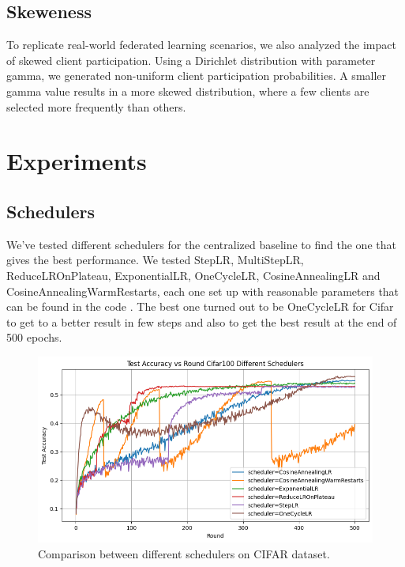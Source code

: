 \documentclass[10pt,twocolumn,letterpaper]{article}
\begin{document}
\subsection{Skeweness}
To replicate real-world federated learning scenarios, we also analyzed the impact of skewed client participation.
Using a Dirichlet distribution with parameter gamma, we generated non-uniform client participation probabilities. A smaller gamma value results in a more skewed distribution, where a few clients are selected more frequently than others.

\section{Experiments}
\subsection{Schedulers}

We've tested different schedulers for the centralized baseline to find the one that gives the best performance.
We tested StepLR, MultiStepLR, ReduceLROnPlateau, ExponentialLR, OneCycleLR,  CosineAnnealingLR and CosineAnnealingWarmRestarts, each one set up with reasonable parameters that can be found in the code .
The best one turned out to be OneCycleLR for Cifar to get to a better result in few steps and also to get the best result at the end of 500 epochs.

\begin{figure}[h]
\centering
\includegraphics[width=\linewidth]{images/graph_cifar.png}
\caption{Comparison between different schedulers on CIFAR dataset.}
\label{fig:short-a}
\end{figure}
\end{document}
